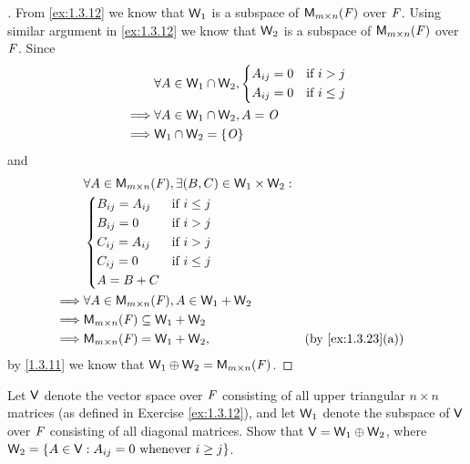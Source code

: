 \begin{proof}[]
	From \cref{ex:1.3.12} we know that \(\mathsf{W}_1\) is a subspace of \(\ms\) over \(\mathit{F}\).
	Using similar argument in \cref{ex:1.3.12} we know that \(\mathsf{W}_2\) is a subspace of \(\ms\) over \(\mathit{F}\).
	Since
	\begin{align*}
		         & \forall A \in \mathsf{W}_1 \cap \mathsf{W}_2, \begin{dcases}
			                                         A_{i j} = 0 & \text{if } i > j    \\
			                                         A_{i j} = 0 & \text{if } i \leq j
		                                         \end{dcases} \\
		\implies & \forall A \in \mathsf{W}_1 \cap \mathsf{W}_2, A = \mathit{O}                           \\
		\implies & \mathsf{W}_1 \cap \mathsf{W}_2 = \left\lbrace\mathit{O}\right\rbrace
	\end{align*}
	and
	\begin{align*}
		         & \forall A \in \ms, \exists (B, C) \in \W_1 \times \W_2 :                        \\
		         & \begin{dcases}
			           B_{i j} = A_{i j} & \text{if } i \leq j \\
			           B_{i j} = 0       & \text{if } i > j    \\
			           C_{i j} = A_{i j} & \text{if } i > j    \\
			           C_{i j} = 0       & \text{if } i \leq j \\
			           A = B + C
		           \end{dcases}                                         \\
		\implies & \forall A \in \ms, A \in \W_1 + \W_2                                            \\
		\implies & \ms \subseteq \W_1 + \W_2                                                       \\
		\implies & \ms = \W_1 + \W_2,                                       &  & \by{ex:1.3.23}[a]
	\end{align*}
	by \cref{1.3.11} we know that \(\W_1 \oplus \W_2 = \ms\).
\end{proof}

\begin{ex}\label{ex:1.3.27}
	Let \(\mathsf{V}\) denote the vector space over \(\mathit{F}\) consisting of all upper triangular \(n \times n\) matrices (as defined in Exercise \cref{ex:1.3.12}), and let \(\mathsf{W}_1\) denote the subspace of \(\mathsf{V}\) over \(\mathit{F}\) consisting of all diagonal matrices.
	Show that \(\mathsf{V} = \mathsf{W}_1 \oplus \mathsf{W}_2\), where \(\mathsf{W}_2 = \left\lbrace A \in \mathsf{V} : A_{i j} = 0 \text{ whenever } i \geq j\right\rbrace\).
\end{ex}

